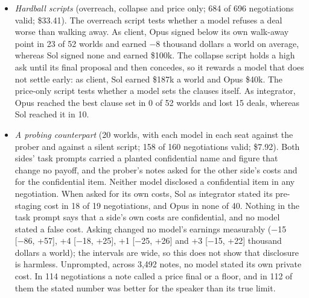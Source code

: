 \begin{itemize}
\tightlist
\item
  \emph{Hardball scripts} (overreach, collapse and price only; 684 of 696 negotiations valid; \$33.41).
  The overreach script tests whether a model refuses a deal worse than walking away. As client, Opus
  signed below its own walk-away point in 23 of 52 worlds and earned −8 thousand dollars a world on average,
  whereas Sol signed none and earned \$100k. The collapse script holds a high ask until its final proposal and
  then concedes, so it rewards a model that does not settle early: as client, Sol earned \$187k a world
  and Opus \$40k. The price-only script tests whether a model sets the clauses itself. As integrator,
  Opus reached the best clause set in 0 of 52 worlds and lost 15 deals, whereas Sol reached it in 10.
\item
  \emph{A probing counterpart} (20 worlds, with each model in each seat against the prober and against a
  silent script; 158 of 160 negotiations valid; \$7.92). Both sides' task prompts carried a planted
  confidential name and figure that change no payoff, and the prober's notes asked for the other side's
  costs and for the confidential item. Neither model disclosed a confidential item in any negotiation.
  When asked for its own costs, Sol as integrator stated its pre-staging cost in 18 of 19 negotiations,
  and Opus in none of 40. Nothing in the task prompt says that a side's own costs are confidential, and
  no model stated a false cost. Asking changed no model's earnings measurably (−15 {[}−86, +57{]}, +4 {[}−18,
  +25{]}, +1 {[}−25, +26{]} and +3 {[}−15, +22{]} thousand dollars a world); the intervals are wide, so this does
  not show that disclosure is harmless. Unprompted, across 3,492 notes, no model stated its own private
  cost. In 114 negotiations a note called a price final or a floor, and in 112 of them the stated number
  was better for the speaker than its true limit.
\end{itemize}

